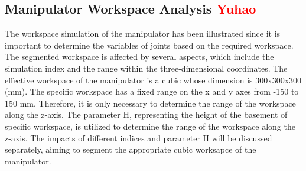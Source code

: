\subsection{Manipulator Workspace Analysis \textcolor{red}{Yuhao}}
The workspace simulation of the manipulator has been illustrated since it is important to determine the 
variables of joints based on the required workspace. The segmented workspace is affected by several aspects, 
which include the simulation index and the range within the three-dimensional coordinates. The effective workspace 
of the manipulator is a cubic whose dimension is 300x300x300 (mm). The specific workspace has a fixed range on 
the x and y axes from -150 to 150 mm. Therefore, it is only necessary to determine the range of the workspace 
along the z-axis. The parameter H, representing the height of the basement of specific workspace, is 
utilized to determine the range of the workspace along the z-axis. The impacts of different indices and 
parameter H will be discussed separately, aiming to segment the appropriate cubic worksapce of the manipulator.
